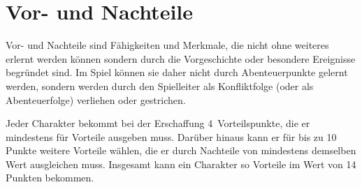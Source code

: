 \section{Vor- und Nachteile}\label{VorUndNachteile}
Vor- und Nachteile sind Fähigkeiten und Merkmale, die nicht ohne weiteres erlernt werden können sondern durch die Vorgeschichte oder besondere Ereignisse begründet sind. Im Spiel können sie daher nicht durch Abenteuerpunkte gelernt werden, sondern werden durch den Spielleiter als Konfliktfolge (oder als Abenteuerfolge) verliehen oder gestrichen.

Jeder Charakter bekommt bei der Erschaffung 4~Vorteilspunkte, die er mindestens für Vorteile ausgeben muss. Darüber hinaus kann er für bis zu 10 Punkte weitere Vorteile wählen, die er durch Nachteile von mindestens demselben Wert ausgleichen muss. Insgesamt kann ein Charakter so Vorteile im Wert von 14 Punkten bekommen.

